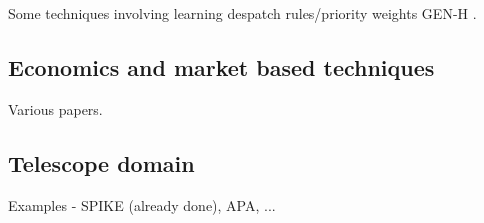 Some techniques involving learning despatch rules/priority weights GEN-H \cite{morris97automatic}. 


%
%
\subsection{Economics and market based techniques}
Various papers.

%
%
\subsection{Telescope domain}
Examples - SPIKE (already done), APA, ...
